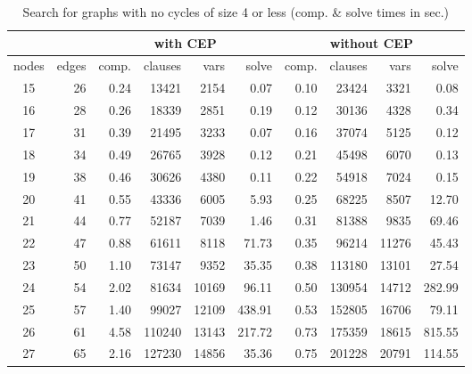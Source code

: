 \documentclass[runningheads,a4paper]{llncs}
\begin{document}
\begin{table}
  \centering\small
\begin{tabular}{|cr|rrrr|rrrr|}
\cline{3-10}
\multicolumn{2}{c|}{}
       &\multicolumn{4}{c|}{with CEP}&\multicolumn{4}{c|}{without CEP}\\
\hline
nodes &  edges & comp.&clauses&vars&solve&    comp.&clauses&vars&solve \\
\hline
15 & 26 & 0.24 & 13421 & 2154 & 0.07 &
          0.10 & 23424 & 3321 & 0.08 \\

16 & 28 & 0.26 & 18339 & 2851 & 0.19 &
          0.12 & 30136 & 4328 & 0.34 \\

17 & 31 & 0.39 & 21495 & 3233 & 0.07 &
          0.16 & 37074 & 5125 & 0.12 \\

18 & 34 & 0.49 & 26765 & 3928 & 0.12 &
     0.21 & 45498 & 6070 & 0.13 \\

19 & 38 & 0.46 & 30626 & 4380 & 0.11 &
     0.22 & 54918 & 7024 & 0.15 \\

20 & 41 & 0.55 & 43336 & 6005 & 5.93 &
     0.25 & 68225 & 8507 & 12.70 \\

21 & 44 & 0.77 & 52187 & 7039 & 1.46 &
     0.31 & 81388 & 9835 &69.46 \\

22 & 47 & 0.88 & 61611 & 8118 & 71.73 &
     0.35 & 96214 &11276 & 45.43 \\

23 & 50 & 1.10 & 73147 & 9352 & 35.35 &
     0.38 &113180 &13101 & 27.54 \\

24 & 54 & 2.02 & 81634 &10169 & 96.11 &
     0.50 &130954 &14712 & 282.99 \\

25 & 57 & 1.40 & 99027 &12109 & 438.91 &
     0.53 &152805 &16706 & 79.11 \\

26 & 61 & 4.58 &110240 &13143 & 217.72 &
     0.73 &175359 &18615 & 815.55 \\

27 & 65 & 2.16 &127230 &14856 & 35.36 &
     0.75 &201228 &20791 & 114.55 \\
\hline
\end{tabular}
  \caption{Search for graphs with no
    cycles of size 4 or less (comp. \& solve times in sec.)}
  \label{table:cep}
\end{table}
\end{document}

